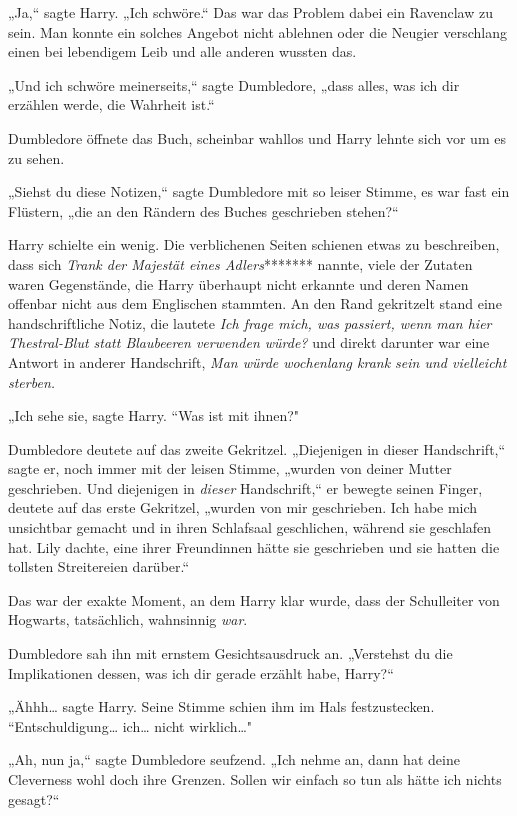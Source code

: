 {„Ja,“ sagte Harry. „Ich schwöre.“ Das war das Problem dabei ein Ravenclaw zu sein. Man konnte ein solches Angebot nicht ablehnen oder die Neugier verschlang einen bei lebendigem Leib und alle anderen wussten das.

„Und ich schwöre meinerseits,“ sagte Dumbledore, „dass alles, was ich dir erzählen werde, die Wahrheit ist.“

Dumbledore öffnete das Buch, scheinbar wahllos und Harry lehnte sich vor um es zu sehen.

„Siehst du diese Notizen,“ sagte Dumbledore mit so leiser Stimme, es war fast ein Flüstern, „die an den Rändern des Buches geschrieben stehen?“

Harry schielte ein wenig. Die verblichenen Seiten schienen etwas zu beschreiben, dass sich \emph{Trank der Majestät eines Adlers}******* nannte, viele der Zutaten waren Gegenstände, die Harry überhaupt nicht erkannte und deren Namen offenbar nicht aus dem Englischen stammten. An den Rand gekritzelt stand eine handschriftliche Notiz, die lautete \emph{Ich frage mich, was passiert, wenn man hier Thestral-Blut statt Blaubeeren verwenden würde?} und direkt darunter war eine Antwort in anderer Handschrift, \emph{Man würde wochenlang krank sein und vielleicht sterben.}

„Ich sehe sie, sagte Harry. “Was ist mit ihnen?"

Dumbledore deutete auf das zweite Gekritzel. „Diejenigen in dieser Handschrift,“ sagte er, noch immer mit der leisen Stimme, „wurden von deiner Mutter geschrieben. Und diejenigen in \emph{dieser} Handschrift,“ er bewegte seinen Finger, deutete auf das erste Gekritzel, „wurden von mir geschrieben. Ich habe mich unsichtbar gemacht und in ihren Schlafsaal geschlichen, während sie geschlafen hat. Lily dachte, eine ihrer Freundinnen hätte sie geschrieben und sie hatten die tollsten Streitereien darüber.“

Das war der exakte Moment, an dem Harry klar wurde, dass der Schulleiter von Hogwarts, tatsächlich, wahnsinnig \emph{war}.

Dumbledore sah ihn mit ernstem Gesichtsausdruck an. „Verstehst du die Implikationen dessen, was ich dir gerade erzählt habe, Harry?“

„Ähhh… sagte Harry. Seine Stimme schien ihm im Hals festzustecken. “Entschuldigung… ich… nicht wirklich…"

„Ah, nun ja,“ sagte Dumbledore seufzend. „Ich nehme an, dann hat deine Cleverness wohl doch ihre Grenzen. Sollen wir einfach so tun als hätte ich nichts gesagt?“

}
